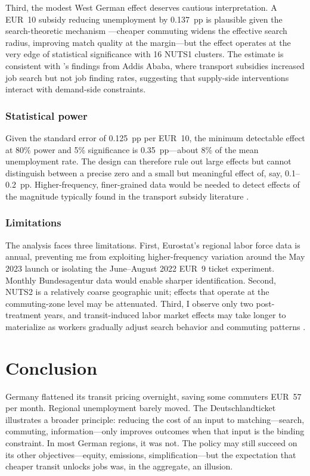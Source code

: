 \documentclass[12pt]{article}
\begin{document}
Third, the modest West German effect deserves cautious interpretation. A EUR~10 subsidy reducing unemployment by 0.137~pp is plausible given the search-theoretic mechanism \citep{marinescu2018mismatch}---cheaper commuting widens the effective search radius, improving match quality at the margin---but the effect operates at the very edge of statistical significance with 16 NUTS1 clusters. The estimate is consistent with \citet{franklin2018location}'s findings from Addis Ababa, where transport subsidies increased job search but not job finding rates, suggesting that supply-side interventions interact with demand-side constraints.

\subsubsection*{Statistical power} Given the standard error of 0.125~pp per EUR~10, the minimum detectable effect at 80\% power and 5\% significance is 0.35~pp---about 8\% of the mean unemployment rate. The design can therefore rule out large effects but cannot distinguish between a precise zero and a small but meaningful effect of, say, 0.1--0.2~pp. Higher-frequency, finer-grained data would be needed to detect effects of the magnitude typically found in the transport subsidy literature \citep{franklin2018location}.

\subsubsection*{Limitations} The analysis faces three limitations. First, Eurostat's regional labor force data is annual, preventing me from exploiting higher-frequency variation around the May 2023 launch or isolating the June--August 2022 EUR~9 ticket experiment. Monthly Bundesagentur data would enable sharper identification. Second, NUTS2 is a relatively coarse geographic unit; effects that operate at the commuting-zone level may be attenuated. Third, I observe only two post-treatment years, and transit-induced labor market effects may take longer to materialize as workers gradually adjust search behavior and commuting patterns \citep{holmgren2007meta}.


\section{Conclusion}
\label{sec:conclusion}

Germany flattened its transit pricing overnight, saving some commuters EUR~57 per month. Regional unemployment barely moved. The Deutschlandticket illustrates a broader principle: reducing the cost of an input to matching---search, commuting, information---only improves outcomes when that input is the binding constraint. In most German regions, it was not. The policy may still succeed on its other objectives---equity, emissions, simplification---but the expectation that cheaper transit unlocks jobs was, in the aggregate, an illusion.
\end{document}
